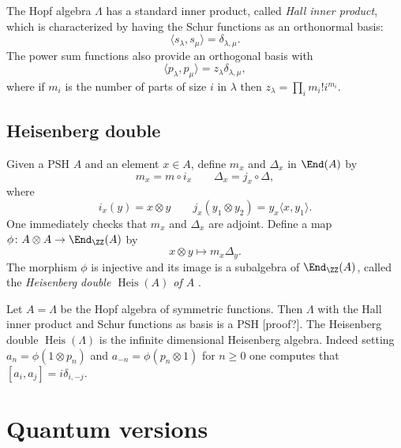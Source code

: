 \documentclass{ck-article}
\DeclareMathOperator\Heis{Heis}
\begin{document}
The Hopf algebra $\Lambda$ has a standard inner product, called \emph{Hall inner product}, which is characterized by having the Schur functions as an orthonormal basis:
\[
    \langle s_\lambda, s_\mu\rangle = \delta_{\lambda,\mu}.
\]
The power sum functions also provide an orthogonal basis with
\[
    \langle p_\lambda, p_\mu\rangle = z_\lambda\delta_{\lambda,\mu},
\]
where if $m_i$ is the number of parts of size $i$ in $\lambda$ then $z_\lambda = \prod_i m_i!i^{m_i}$.

\subsection{Heisenberg double}

Given a PSH $A$ and an element $x \in A$, define $m_x$ and $\Delta_x$ in $\End(A)$ by
\[
    m_x = m \circ i_x \qquad \Delta_x = j_x \circ \Delta,
\]
where
\[
    i_x(y) = x \otimes y \qquad j_x(y_1 \otimes y_2) = y_x \langle x, y_1 \rangle.
\]
One immediately checks that $m_x$ and $\Delta_x$ are adjoint.
Define a map $\phi\colon A \otimes A \to \End_\ZZ(A)$ by
\[
    x \otimes y \mapsto m_x\Delta_y.
\]
The morphism $\phi$ is injective and its image is a subalgebra of $\End_\ZZ(A)$, called the \emph{Heisenberg double $\Heis(A)$ of $A$} \cite[Proposition~5.4]{GalGal:2017:SymmetricSelfajointHopfCategories}.

\begin{Example}
    Let $A = \Lambda$ be the Hopf algebra of symmetric functions.
    Then $\Lambda$ with the Hall inner product and Schur functions as basis is a PSH [proof?].
    The Heisenberg double $\Heis(\Lambda)$ is the infinite dimensional Heisenberg algebra.
    Indeed setting $a_n = \phi(1 \otimes p_n)$ and $a_{-n} = \phi(p_n \otimes 1)$ for $n \ge 0$ one computes that $[a_i, a_j] = i\delta_{i,-j}$.
\end{Example}

\section{Quantum versions}

\printbibliography
\end{document}
